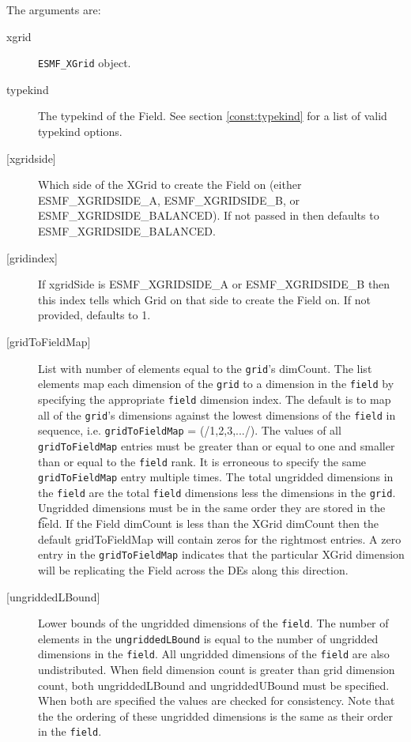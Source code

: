   The arguments are:
   \begin{description}
   \item [xgrid]
   {\tt ESMF\_XGrid} object.
   \item[typekind]
   The typekind of the Field. See section \ref{const:typekind}
   for a list of valid typekind options.
   \item [{[xgridside]}]
   Which side of the XGrid to create the Field on (either ESMF\_XGRIDSIDE\_A,
   ESMF\_XGRIDSIDE\_B, or ESMF\_XGRIDSIDE\_BALANCED). If not passed in then
   defaults to ESMF\_XGRIDSIDE\_BALANCED.
   \item [{[gridindex]}]
   If xgridSide is ESMF\_XGRIDSIDE\_A or ESMF\_XGRIDSIDE\_B then this index tells which Grid on
   that side to create the Field on. If not provided, defaults to 1.
   \item [{[gridToFieldMap]}]
   List with number of elements equal to the
   {\tt grid}'s dimCount. The list elements map each dimension
   of the {\tt grid} to a dimension in the {\tt field} by
   specifying the appropriate {\tt field} dimension index. The default is to
   map all of the {\tt grid}'s dimensions against the lowest dimensions of
   the {\tt field} in sequence, i.e. {\tt gridToFieldMap} = (/1,2,3,.../).
   The values of all {\tt gridToFieldMap} entries must be greater than or equal
   to one and smaller than or equal to the {\tt field} rank.
   It is erroneous to specify the same {\tt gridToFieldMap} entry
   multiple times. The total ungridded dimensions in the {\tt field}
   are the total {\tt field} dimensions less
   the dimensions in
   the {\tt grid}. Ungridded dimensions must be in the same order they are
   stored in the {\t field}.
   If the Field dimCount is less than the XGrid dimCount then the default
   gridToFieldMap will contain zeros for the rightmost entries. A zero
   entry in the {\tt gridToFieldMap} indicates that the particular
   XGrid dimension will be replicating the Field across the DEs along
   this direction.
   \item [{[ungriddedLBound]}]
   Lower bounds of the ungridded dimensions of the {\tt field}.
   The number of elements in the {\tt ungriddedLBound} is equal to the number of ungridded
   dimensions in the {\tt field}. All ungridded dimensions of the
   {\tt field} are also undistributed. When field dimension count is
   greater than grid dimension count, both ungriddedLBound and ungriddedUBound
   must be specified. When both are specified the values are checked
   for consistency. Note that the the ordering of
   these ungridded dimensions is the same as their order in the {\tt field}.

\end{description}
